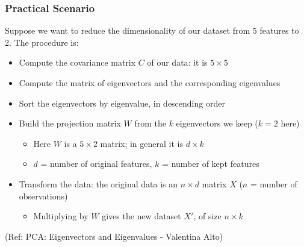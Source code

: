 \begin{frame}[fragile] \frametitle{Practical Scenario}

Suppose we want to reduce the dimensionality of our dataset from 5 features to 2. The procedure is:

\begin{itemize}
\item Compute the covariance matrix $C$ of our data: it is $5 \times 5$
\item Compute the matrix of eigenvectors and the corresponding eigenvalues
\item Sort the eigenvectors by eigenvalue, in descending order
\item Build the projection matrix $W$ from the $k$ eigenvectors we keep ($k = 2$ here)
\begin{itemize}
\item Here $W$ is a $5 \times 2$ matrix; in general it is $d \times k$
\item $d$ = number of original features, $k$ = number of kept features
\end{itemize}
\item Transform the data: the original data is an $n \times d$ matrix $X$ ($n$ = number of observations)
\begin{itemize}
\item Multiplying by $W$ gives the new dataset $X'$, of size $n \times k$
\end{itemize}
\end{itemize}

{\tiny (Ref: PCA: Eigenvectors and Eigenvalues - Valentina Alto)}

\end{frame}





